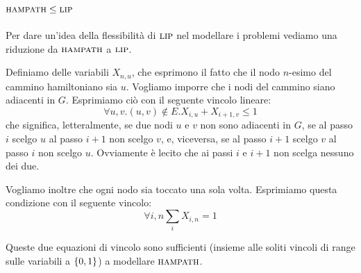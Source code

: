 \subsection{$\textsc{hampath} \leq \textsc{lip}$}

Per dare un'idea della flessibilità di $\textsc{lip}$ nel modellare i problemi vediamo una riduzione da
$\textsc{hampath}$ a $\textsc{lip}$.

Definiamo delle variabili $X_{n,u}$, che esprimono il fatto che il nodo $n$-esimo del cammino
hamiltoniano sia $u$. Vogliamo imporre che i nodi del cammino siano adiacenti in $G$. Esprimiamo
ciò con il seguente vincolo lineare:
\begin{equation*}
    \forall u,v.(u,v) \notin E. X_{i,u} + X_{i+1,v} \leq 1
\end{equation*}
che significa, letteralmente, se due nodi $u$ e $v$ non sono adiacenti in $G$, se al passo $i$
scelgo $u$ al passo $i+1$ non scelgo $v$, e, viceversa, se al passo $i+1$ scelgo $v$ al passo $i$
non scelgo $u$. Ovviamente è lecito che ai passi $i$ e $i+1$ non scelga nessuno dei due.

Vogliamo inoltre che ogni nodo sia toccato una sola volta. Esprimiamo questa condizione con il
seguente vincolo:
\begin{equation*}
    \forall i,n \sum_{i}X_{i,n} = 1
\end{equation*}

Queste due equazioni di vincolo sono sufficienti (insieme alle soliti vincoli di range sulle
variabili a $\left\{0,1\right\}$) a modellare $\textsc{hampath}$.
